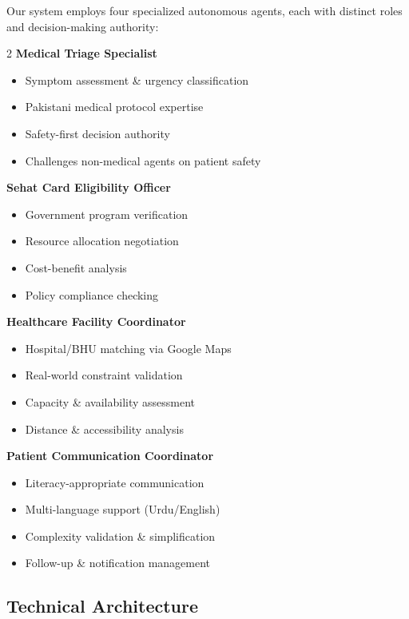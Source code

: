 \documentclass[11pt,a4paper]{article}
\begin{document}
Our system employs four specialized autonomous agents, each with distinct roles and decision-making authority:

\begin{multicols}{2}
\textbf{Medical Triage Specialist}
\begin{itemize}[leftmargin=*, itemsep=0pt]
    \item Symptom assessment \& urgency classification
    \item Pakistani medical protocol expertise
    \item Safety-first decision authority
    \item Challenges non-medical agents on patient safety
\end{itemize}

\textbf{Sehat Card Eligibility Officer}
\begin{itemize}[leftmargin=*, itemsep=0pt]
    \item Government program verification
    \item Resource allocation negotiation
    \item Cost-benefit analysis
    \item Policy compliance checking
\end{itemize}

\textbf{Healthcare Facility Coordinator}
\begin{itemize}[leftmargin=*, itemsep=0pt]
    \item Hospital/BHU matching via Google Maps
    \item Real-world constraint validation
    \item Capacity \& availability assessment
    \item Distance \& accessibility analysis
\end{itemize}

\textbf{Patient Communication Coordinator}
\begin{itemize}[leftmargin=*, itemsep=0pt]
    \item Literacy-appropriate communication
    \item Multi-language support (Urdu/English)
    \item Complexity validation \& simplification
    \item Follow-up \& notification management
\end{itemize}
\end{multicols}

\subsection{Technical Architecture}
\end{document}
